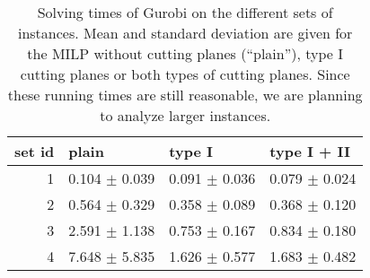 

\begin{knitrout}
\color{fgcolor}\begin{table}

\caption{\label{tab:unnamed-chunk-2}Solving times of Gurobi on the different sets of instances. Mean and standard deviation are given for the MILP without cutting planes (``plain''), type I cutting planes or both types of cutting planes. {\color{blue} Since these running times are still reasonable, we are planning to analyze larger instances.} \label{tab:running_times}}
\centering
\begin{tabular}[t]{rlll}
\toprule
set id & plain & type I & type I + II\\
\midrule
1 & 0.104 $\pm$ 0.039 & 0.091 $\pm$ 0.036 & 0.079 $\pm$ 0.024\\
2 & 0.564 $\pm$ 0.329 & 0.358 $\pm$ 0.089 & 0.368 $\pm$ 0.120\\
3 & 2.591 $\pm$ 1.138 & 0.753 $\pm$ 0.167 & 0.834 $\pm$ 0.180\\
4 & 7.648 $\pm$ 5.835 & 1.626 $\pm$ 0.577 & 1.683 $\pm$ 0.482\\
\bottomrule
\end{tabular}
\end{table}

\end{knitrout}
